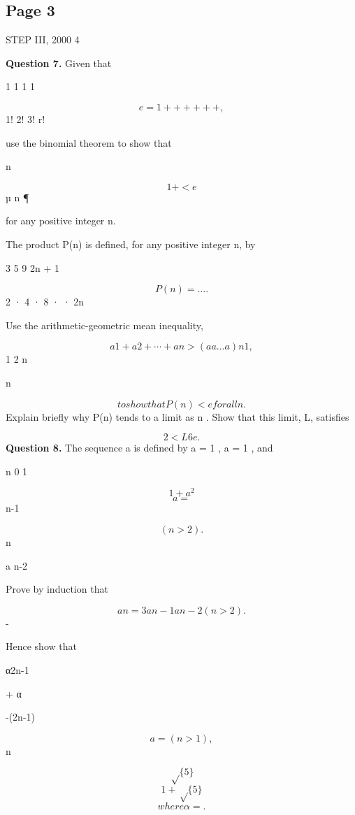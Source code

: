 \documentclass[12pt]{article}
\begin{document}
\subsection*{Page 3}
\begin{flushleft}
STEP III, 2000 4\par
\bigskip\textbf{Question 7.} Given that\par
1 1 1 1\par
\[e = 1 + + + + + + ,\]
1! 2! 3! \cdots r! \cdots\par
use the binomial theorem to show that\par
n\par
\[1 + < e\]
µ n ¶\par
for any positive integer n.\par
The product P(n) is defined, for any positive integer n, by\par
3 5 9 2n + 1\par
\[P(n) = . . . .\]
2 · 4 · 8 · · 2n\par
Use the arithmetic-geometric mean inequality,\par
\[a 1 + a 2 + \cdots + a n > (a a . . . a ) n 1 ,\]
1 2 n\par
n \cdots\par
\[to show that P(n) < e for all n .\]
Explain briefly why P(n) tends to a limit as n . Show that this limit, L, satisfies\par
\to \infty\par
\[2 < L 6 e.\]
\bigskip\textbf{Question 8.} The sequence a is defined by a = 1 , a = 1 , and\par
n 0 1\par
\[1 + a^2\]
\[a =\]
n-1\par
\[(n > 2).\]
n\par
a n-2\par
Prove by induction that\par
\[a n = 3a n-1 a n-2 (n > 2).\]
-\par
Hence show that\par
α2n-1\par
+ α\par
-(2n-1)\par
\[a = (n > 1),\]
n\par
\[\sqrt\{5\}\]
\[1 + \sqrt\{5\}\]
\[where α = .\]
\end{flushleft}
\end{document}
